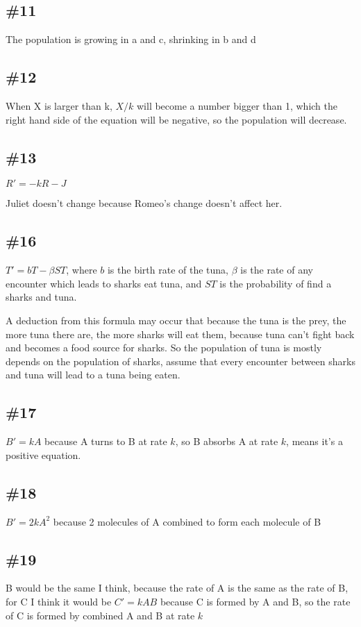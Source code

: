 \documentclass[12pt]{article}
\begin{document}
\subsection*{\#11}
The population is growing in a and c, shrinking in b and d

\subsection*{\#12}
When X is larger than k, $X/k$ will become a number bigger than 1, which the right hand side of the equation will be negative, so the population will decrease.

\subsection*{\#13}
$R' = -kR - J$

Juliet doesn't change because Romeo's change doesn't affect her.

\subsection*{\#16}
$T' = bT - \beta ST$, where $b$ is the birth rate of the tuna, $\beta$ is the rate of any encounter which leads to sharks eat tuna, and $ST$ is the probability of find a sharks and tuna.

A deduction from this formula may occur that because the tuna is the prey, the more tuna there are, the more sharks will eat them, because tuna can't fight back and becomes a food source for sharks. So the population of tuna is mostly depends on the population of sharks, assume that every encounter between sharks and tuna will lead to a tuna being eaten.
\subsection*{\#17}
$B' = kA$ because A turns to B at rate $k$, so B absorbs A at rate $k$, means it's a positive equation.

\subsection*{\#18}
$B' = 2kA^2$ because 2 molecules of A combined to form each molecule of B

\subsection*{\#19}
B would be the same I think, because the rate of A is the same as the rate of B, for C I think it would be $C' = kAB$ because C is formed by A and B, so the rate of C is formed by combined A and B at rate $k$
\end{document}
